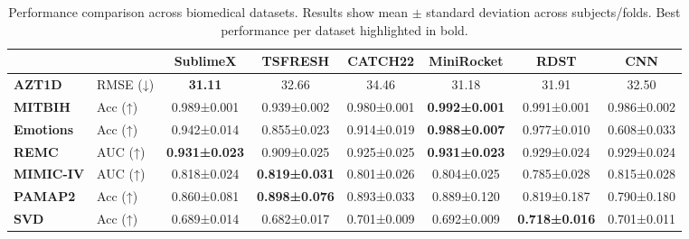 \begin{table}[H]
\centering
\caption{Performance comparison across biomedical datasets. Results show mean $\pm$ standard deviation across subjects/folds. Best performance per dataset highlighted in bold.}
\label{tab:results}
\tiny
\setlength{\tabcolsep}{1pt}
\renewcommand{\arraystretch}{0.85}
\begin{tabular*}{\textwidth}{@{\extracolsep{\fill}}llcccccc@{}}
\toprule
 &  & \textbf{SublimeX} & \textbf{TSFRESH} & \textbf{CATCH22} & \textbf{MiniRocket} & \textbf{RDST} & \textbf{CNN} \\
\midrule
\textbf{AZT1D} & RMSE (↓) & \textbf{31.11} & 32.66 & 34.46 & 31.18 & 31.91 & 32.50 \\
\midrule
\textbf{MITBIH} & Acc (↑) & 0.989±0.001 & 0.939±0.002 & 0.980±0.001 & \textbf{0.992±0.001} & 0.991±0.001 & 0.986±0.002 \\
\midrule
\textbf{Emotions} & Acc (↑) & 0.942±0.014 & 0.855±0.023 & 0.914±0.019 & \textbf{0.988±0.007} & 0.977±0.010 & 0.608±0.033 \\
\midrule
\textbf{REMC} & AUC (↑) & \textbf{0.931±0.023} & 0.909±0.025 & 0.925±0.025 & \textbf{0.931±0.023} & 0.929±0.024 & 0.929±0.024 \\
\midrule
\textbf{MIMIC-IV} & AUC (↑) & 0.818±0.024 & \textbf{0.819±0.031} & 0.801±0.026 & 0.804±0.025 & 0.785±0.028 & 0.815±0.028 \\
\midrule
\textbf{PAMAP2} & Acc (↑) & 0.860±0.081 & \textbf{0.898±0.076} & 0.893±0.033 & 0.889±0.120 & 0.819±0.187 & 0.790±0.180 \\
\midrule
\textbf{SVD} & Acc (↑) & 0.689±0.014 & 0.682±0.017 & 0.701±0.009 & 0.692±0.009 & \textbf{0.718±0.016} & 0.701±0.011 \\
\bottomrule
\end{tabular*}
\end{table}
